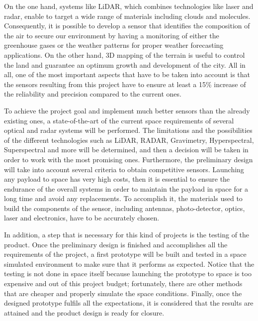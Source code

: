 On the one hand, systems like LiDAR, which combines technologies like laser and radar, enable to target a wide range of materials including clouds and molecules. Consequently, it is possible to develop a sensor that identifies the composition of the air to secure our environment by having a monitoring of either the greenhouse gases or the weather patterns for proper weather forecasting applications. On the other hand, 3D mapping of the terrain is useful to control the land and guarantee an optimum growth and development of the city. All in all, one of the most important aspects that have to be taken into account is that the sensors resulting from this project have to ensure at least a 15\% increase of the reliability and precision compared to the current ones.

To achieve the project goal and implement much better sensors than the already existing ones, a state-of-the-art of the current space requirements of several optical and radar systems will be performed. The limitations and the possibilities of the different technologies such as LiDAR, RADAR, Gravimetry, Hyperspectral, Superspectral and more will be determined, and then a decision will be taken in order to work with the most promising ones. Furthermore, the preliminary design will take into account several criteria to obtain competitive sensors. Launching any payload to space has very high costs, then it is essential to ensure the endurance of the overall systems in order to maintain the payload in space for a long time and avoid any replacements. To accomplish it, the materials used to build the components of the sensor, including antennas, photo-detector, optics, laser and electronics, have to be accurately chosen.

In addition, a step that is necessary for this kind of projects is the testing of the product. Once the preliminary design is finished and accomplishes all the requirements of the project, a first prototype will be built and tested in a space simulated environment to make sure that it performs as expected. Notice that the testing is not done in space itself because launching the prototype to space is too expensive and out of this project budget; fortunately, there are other methods that are cheaper and properly simulate the space conditions. Finally, once the designed prototype fulfils all the expectations, it is considered that the results are attained and the product design is ready for closure.